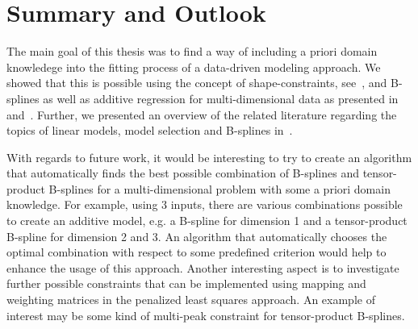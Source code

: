 \chapter{Summary and Outlook} \label{cha:summary}

The main goal of this thesis was to find a way of including a priori domain knowledege into the fitting process of a data-driven modeling approach. We showed that this is possible using the concept of shape-constraints, see~, and B-splines as well as additive regression for multi-dimensional data as presented in~ and~. Further, we presented an overview of the related literature regarding the topics of linear models, model selection and B-splines in~. 

With regards to future work, it would be interesting to try to create an algorithm that automatically finds the best possible combination of B-splines and tensor-product B-splines for a multi-dimensional problem with some a priori domain knowledge. For example, using 3 inputs, there are various combinations possible to create an additive model, e.g. a B-spline for dimension 1 and a tensor-product B-spline for dimension 2 and 3. An algorithm that automatically chooses the optimal combination with respect to some predefined criterion would help to enhance the usage of this approach. Another interesting aspect is to investigate further possible constraints that can be implemented using mapping and weighting matrices in the penalized least squares approach. An example of interest may be some kind of multi-peak constraint for tensor-product B-splines. 